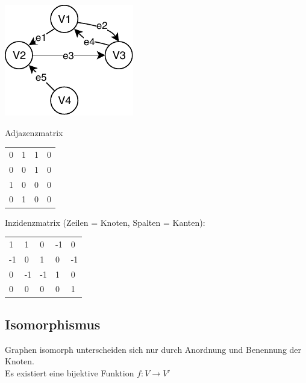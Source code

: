 \documentclass[8pt,landscape]{scrartcl}
\begin{document}
\begin{multicols}{3}
\includegraphics[width=0.5\linewidth]{inzidenz.pdf}

Adjazenzmatrix\\
\begin{tabular}{llll}
0 & 1 & 1 & 0\\
0 & 0 & 1 & 0\\
1 & 0 & 0 & 0\\
0 & 1 & 0 & 0
\end{tabular}


Inzidenzmatrix (Zeilen = Knoten, Spalten = Kanten):\\
\begin{tabular}{lllll}
1 & 1 & 0 & -1 & 0\\
-1 & 0 & 1 & 0 & -1\\
0 & -1 & -1 & 1 & 0\\
0 & 0 & 0 & 0 & 1
\end{tabular}

\subsection{Isomorphismus}
Graphen isomorph unterscheiden sich nur durch Anordnung und Benennung der Knoten.\\
Es existiert eine bijektive Funktion $f: V \rightarrow V'$




\end{multicols}
\end{document}
